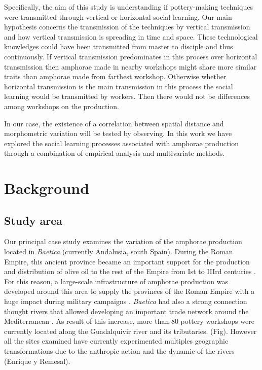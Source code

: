 \documentclass[review]{elsarticle}
\begin{document}
Specifically, the aim of this study is understanding if pottery-making techniques were transmitted through vertical or horizontal social learning. Our main hypothesis concerns the transmission of the techniques by vertical transmission and how vertical transmission is spreading in time and space. These technological knowledges could have been transmitted from master to disciple and thus continuously. If vertical transmission predominates in this process over horizontal transmission then amphorae made in nearby workshops might share more similar traits than amphorae made from farthest workshop. Otherwise whether horizontal transmission is the main transmission in this process the social learning would be transmitted by workers. Then there would not be differences among workshops on the production.     

In our case, the existence of a correlation between spatial distance and morphometric variation will be tested by observing. In this work we have explored the social learning processes associated with amphorae production through a combination of empirical analysis and multivariate methods. 


\section{Background}

\subsection{Study area}

Our principal case study examines the variation of the amphorae production located in \emph{Baetica} (currently Andalusia, south Spain). During the Roman Empire, this ancient province became an important support for the production and distribution of  olive oil to the rest of the Empire from Ist to IIIrd centuries \cite{rodriguez_baetican_1998}. For this reason, a large-scale infrastructure of amphorae production was developed around this area to supply the provinces of the Roman Empire with a huge impact during military campaigns \citep{monfort_britannia_1998}.  
\emph{Baetica} had also a strong connection thought rivers that allowed developing an important trade network around the Mediterranean \citep{garcia_vargas_enrique_formal_2010}. As result of this increase, more than 80 pottery workshops were currently located along the Guadalquivir river and its tributaries. (Fig). However all the sites examined have currently experimented multiples geographic transformations due to the anthropic action and the dynamic of the rivers (Enrique y Remesal). 
\end{document}
